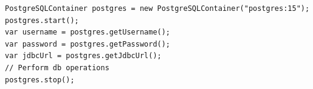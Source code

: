 \documentclass[table, xcdraw]{article}%
\begin{document}
\begin{verbatim}
PostgreSQLContainer postgres = new PostgreSQLContainer("postgres:15");
postgres.start();
var username = postgres.getUsername();
var password = postgres.getPassword();
var jdbcUrl = postgres.getJdbcUrl();
// Perform db operations
postgres.stop();
\end{verbatim}

\end{document}
